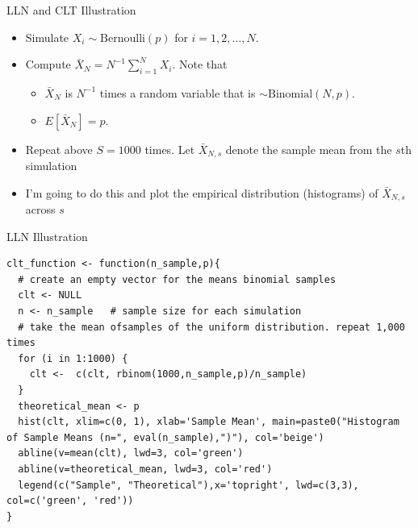 \begin{frame}{LLN and CLT Illustration}
\begin{itemize}
	\item Simulate $X_i\sim \text{Bernoulli}\left(p\right)$ for $i=1,2,\dots,N$.
	\item Compute $\bar{X}_N = N^{-1}\sum_{i=1}^N X_i$. Note that 
	\begin{itemize}
		\item $\bar{X}_N$ is $N^{-1}$ times a random variable that is $\sim \text{Binomial}\left(N,p\right)$. 
		\item $E\left[\bar{X}_N \right]=p$.
	\end{itemize}
	\item Repeat above $S=1000$ times. Let $\bar{X}_{N,s}$ denote the sample mean from the $s$th simulation
	
	\item I'm going to do this and plot the empirical distribution (histograms) of $\bar{X}_{N,s}$ across $s$
\end{itemize}
\end{frame}

\begin{frame}[fragile]{LLN Illustration}
\begin{lstlisting}
clt_function <- function(n_sample,p){
  # create an empty vector for the means binomial samples
  clt <- NULL
  n <- n_sample   # sample size for each simulation
  # take the mean ofsamples of the uniform distribution. repeat 1,000 times
  for (i in 1:1000) {
    clt <-  c(clt, rbinom(1000,n_sample,p)/n_sample)
  }
  theoretical_mean <- p
  hist(clt, xlim=c(0, 1), xlab='Sample Mean', main=paste0("Histogram of Sample Means (n=", eval(n_sample),")"), col='beige')
  abline(v=mean(clt), lwd=3, col='green')
  abline(v=theoretical_mean, lwd=3, col='red')
  legend(c("Sample", "Theoretical"),x='topright', lwd=c(3,3), col=c('green', 'red'))
}
\end{lstlisting}
\end{frame}


